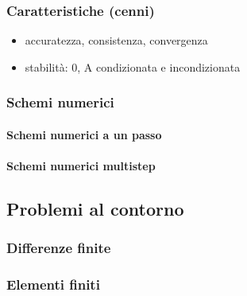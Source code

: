 \documentclass[letterpaper,10pt,english]{jupyterBook}
\begin{document}
\subsubsection{Caratteristiche (cenni)}
\label{\detokenize{ch/numerics/ode-cauchy:caratteristiche-cenni}}\begin{itemize}
\item {} 
\sphinxAtStartPar
accuratezza, consistenza, convergenza

\item {} 
\sphinxAtStartPar
stabilità: 0\sphinxhyphen{}, A\sphinxhyphen{} condizionata e incondizionata

\end{itemize}


\subsubsection{Schemi numerici}
\label{\detokenize{ch/numerics/ode-cauchy:schemi-numerici}}

\paragraph{Schemi numerici a un passo}
\label{\detokenize{ch/numerics/ode-cauchy:schemi-numerici-a-un-passo}}

\paragraph{Schemi numerici multi\sphinxhyphen{}step}
\label{\detokenize{ch/numerics/ode-cauchy:schemi-numerici-multi-step}}
\sphinxstepscope


\subsection{Problemi al contorno}
\label{\detokenize{ch/numerics/ode-boundary:problemi-al-contorno}}\label{\detokenize{ch/numerics/ode-boundary::doc}}

\subsubsection{Differenze finite}
\label{\detokenize{ch/numerics/ode-boundary:differenze-finite}}

\subsubsection{Elementi finiti}
\label{\detokenize{ch/numerics/ode-boundary:elementi-finiti}}
\end{document}
